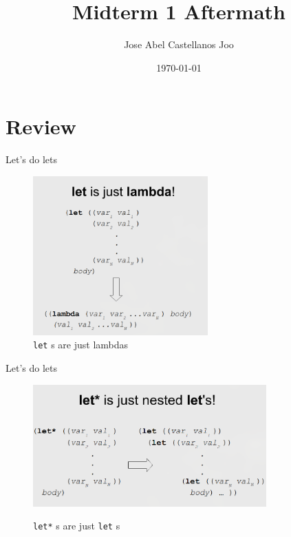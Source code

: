\documentclass{beamer}
\begin{document}
\title{Midterm 1 Aftermath}  
\author{Jose Abel Castellanos Joo}
\date{\today} 

\frame{\titlepage} 


% 
% 

\section{Review}

\begin{frame}[fragile]{Let's do lets}
  \begin{figure}[htpb]
    \centering
    \includegraphics[width=0.6\textwidth]{./figures/let.png}
    \caption{\verb|let| s are just lambdas}
    \label{fig:let.png}
  \end{figure}

\end{frame}

\begin{frame}[fragile]{Let's do lets}
  \begin{figure}[htpb]
    \centering
    \includegraphics[width=0.8\textwidth]{./figures/let_star.png}
    \label{fig:let_star.png}
    \caption{\verb|let*| s are just \verb|let| s}
  \end{figure}
\end{frame}
\end{document}
